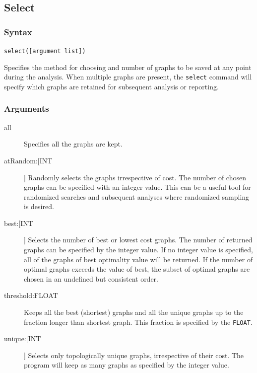 \subsection{Select}
	\subsubsection{Syntax}
		\texttt{select([argument list])}
	
	\begin{phygdescription}
		{Specifies the method for choosing and number of graphs to be saved at any point 
		during the analysis. When multiple graphs are present, the \texttt{select} command 
		will specify which graphs are retained for subsequent analysis or reporting.}
	\end{phygdescription}
				
	\subsubsection{Arguments}
	\begin{description}
		
		\item[all] Specifies all the graphs are kept.
		
		\item[atRandom:[INT]] Randomly selects the graphs irrespective of cost. The 
		number of chosen graphs can be specified with an integer value. This can 
		be a useful tool for randomized searches and subsequent analyses where 
		randomized sampling is desired.
			
		\item[best:[INT]] Selects the number of best or lowest cost graphs. The number 
		of returned graphs can be specified by the integer value. If no integer value is 
		specified, all of the graphs of best optimality value will be returned. If the number 
		of optimal graphs exceeds the value of best, the subset of optimal graphs are 
		chosen in an undefined but consistent order.
							
		\item[threshold:FLOAT] Keeps all the best (shortest) graphs and all the unique 
		graphs up to the fraction longer than shortest graph. This fraction is specified by 
		the \texttt{FLOAT}.
			
		\item[unique:[INT]] Selects only topologically unique graphs, irrespective of their
		cost. The program will keep as many graphs as specified by the integer value.
			
	\end{description}

